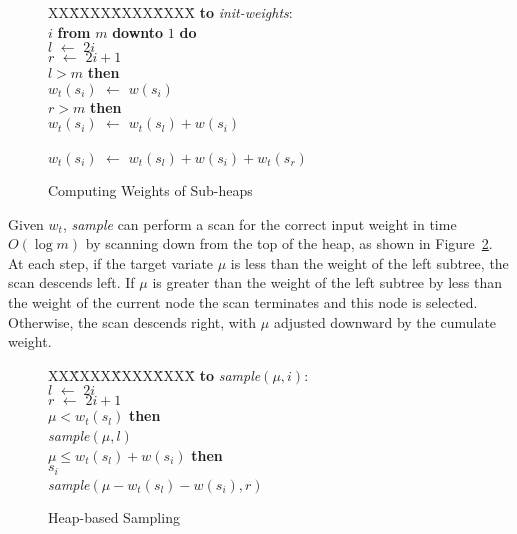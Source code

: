 \documentclass[12pt]{article}
\newcommand{\asgn}{\,\,\leftarrow\,\,}
\begin{document}
  \begin{figure}
    \centering
    \begin{minipage}{0.6\textwidth}
      \begin{tabbing}
      XX\=XXXX\=XXXX\=XXXX\=\kill
      {\bf to} {\it init-weights}: \\
       $i$ {\bf from} $m$ {\bf downto} $1$ {\bf do} \\
      \>\>$l \asgn 2i$ \\
      \>\>$r \asgn 2i + 1$ \\
      \> $l > m$ {\bf then} \\
      \>\>\>$w_t(s_i) \asgn w(s_i)$ \\
      \> $r > m$ {\bf then} \\
      \>\>\>$w_t(s_i) \asgn w_t(s_l) + w(s_i)$ \\
      \>\\
      \>\>\>$w_t(s_i) \asgn w_t(s_l) + w(s_i) + w_t(s_r)$
    \end{tabbing}
    \end{minipage}
    \caption{Computing Weights of Sub-heaps}\label{fig-heap}
  \end{figure}

  Given $w_t$, {\em sample} can perform a scan for the
  correct input weight in time $O(\log m)$ by scanning down
  from the top of the heap, as shown in
  Figure~\ref{fig-onlm}.  At each step, if the target
  variate $\mu$ is less than the weight of the left subtree,
  the scan descends left.  If $\mu$ is greater than the
  weight of the left subtree by less than the weight of the
  current node the scan terminates and this node is
  selected.  Otherwise, the scan descends right, with
  $\mu$ adjusted downward by the cumulate weight.

  \begin{figure}
    \centering
    \begin{minipage}{0.6\textwidth}
      \begin{tabbing}
      XX\=XXXX\=XXXX\=XXXX\=\kill
      {\bf to} {\it sample}$(\mu,i)$: \\
      \>$l \asgn 2i$ \\
      \>$r \asgn 2i + 1$ \\
       $\mu < w_t(s_l)$ {\bf then} \\
      \> {\it sample}$(\mu, l)$ \\
       $\mu \le w_t(s_l) + w(s_i)$ {\bf then} \\
      \> $s_i$ \\
       {\it sample}$(\mu - w_t(s_l) - w(s_i), r)$
    \end{tabbing}
    \end{minipage}
    \caption{Heap-based Sampling}\label{fig-onlm}
  \end{figure}
\end{document}
